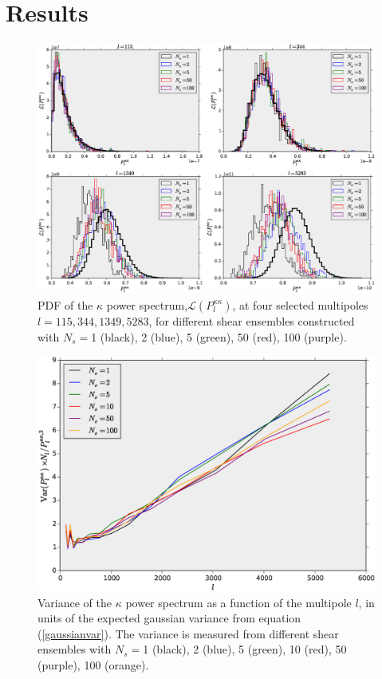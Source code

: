 \documentclass[reprint,aps,prd,superscriptaddress,showkeys,showpacs]{revtex4-1}
\begin{document}
\section{Results}

\begin{figure}
\includegraphics[scale=0.4]{Figures/ps_pdf.eps}
\caption{PDF of the $\kappa$ power spectrum,$\mathcal{L}(P_l^{\kappa\kappa})$, at four selected multipoles $l=115,344,1349,5283$, for different shear ensembles constructed with $N_s=$1 (black), 2 (blue), 5 (green), 50 (red), 100 (purple).}
\label{ps_pdf}
\end{figure}

\begin{figure}
\includegraphics[scale=0.3]{Figures/ps_variance.eps}
\caption{Variance of the $\kappa$ power spectrum as a function of the multipole $l$, in units of the expected gaussian variance from equation (\ref{gaussianvar}). The variance is measured from different shear ensembles with $N_s=$1 (black), 2 (blue), 5 (green), 10 (red), 50 (purple), 100 (orange). }
\label{ps_var}
\end{figure}
\end{document}
